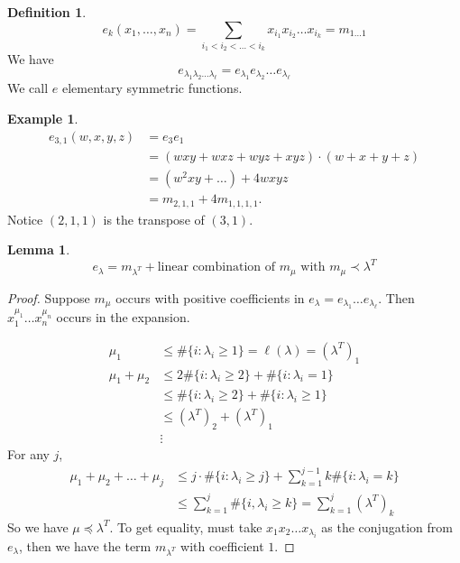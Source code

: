 \documentclass{report}
\newtheorem{lemma}{Lemma}[section]
\theoremstyle{definition}
\newtheorem{definition}{Definition}[section]
\newtheorem{example}{Example}[section]
\theoremstyle{remark}
\numberwithin{equation}{section}
\begin{document}
\begin{definition}
    \[
        e_{k}(x_1, \ldots, x_n) = \sum_{i_1 < i_2 < \ldots < i_k} x_{i_1}x_{i_2}\ldots x_{i_k} = m_{1\ldots1}    
    \]
    We have \[
        e_{\lambda_1\lambda_2\ldots\lambda_\ell} = e_{\lambda_1}e_{\lambda_2}\ldots e_{\lambda_\ell} 
    \]
    We call $e$ elementary symmetric functions.
\end{definition}
\begin{example}
    \begin{align*}
        e_{3,1}(w, x, y, z) & = e_3e_1 \\
        & = (wxy + wxz + wyz + xyz) \cdot (w + x + y + z) \\
        & = (w^2xy + \ldots) + 4wxyz \\
        & = m_{2, 1, 1} + 4m_{1, 1, 1, 1}.
    \end{align*}
    Notice $(2,1,1)$ is the transpose of $(3, 1)$.
\end{example}
\begin{lemma}
    \[
        e_\lambda = m_{\lambda^T} + \text{linear combination of $m_\mu$ with $m_\mu \prec \lambda^T$}    
    \]
\end{lemma}
\begin{proof}
    Suppose $m_\mu$ occurs with positive coefficients in $e_\lambda = e_{\lambda_1}\ldots e_{\lambda_\ell}$. Then $x_1^{\mu_1}\ldots x_n^{\mu_n}$ occurs in the expansion.

    \begin{align*}
        \mu_1 & \leq \#\{i: \lambda_i \geq 1\} = \ell(\lambda) = (\lambda^T)_1 \\
        \mu_1 + \mu_2 & \leq 2\#\{i: \lambda_i \geq 2\} + \#\{i: \lambda_i = 1\} \\
                    & \leq \#\{i: \lambda_i \geq 2\} + \#\{i: \lambda_i \geq 1\} \\
                    & \leq (\lambda^T)_2 + (\lambda^T)_1 \\
                    & \vdots
    \end{align*}
    For any $j$, \begin{align*}
        \mu_1 + \mu_2 + \ldots + \mu_j & \leq j \cdot \#\{i: \lambda_i \geq j\} + \sum_{k=1}^{j-1}k\#\{i: \lambda_i = k\} \\
        & \leq \sum_{k=1}^j \#\{i, \lambda_i \geq k\} = \sum_{k=1}^j (\lambda^T)_k
    \end{align*}
    So we have $\mu \preceq \lambda^T$. To get equality, must take $x_1x_2\ldots x_{\lambda_i}$ as the conjugation from $e_\lambda$, then we have the term $m_{\lambda^T}$ with coefficient $1$.
\end{proof}
\end{document}
